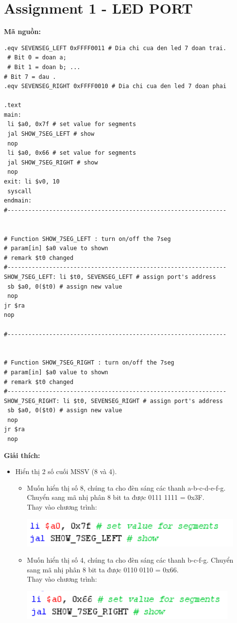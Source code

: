 \documentclass[12pt,a4paper,oneside]{article}
\begin{document}
\section*{Assignment 1 - LED PORT}
\textbf{Mã nguồn:}
\begin{lstlisting}
.eqv SEVENSEG_LEFT 0xFFFF0011 # Dia chi cua den led 7 doan trai.
 # Bit 0 = doan a; 
 # Bit 1 = doan b; ... 
# Bit 7 = dau .
.eqv SEVENSEG_RIGHT 0xFFFF0010 # Dia chi cua den led 7 doan phai

.text
main:
 li $a0, 0x7f # set value for segments
 jal SHOW_7SEG_LEFT # show
 nop
 li $a0, 0x66 # set value for segments
 jal SHOW_7SEG_RIGHT # show 
 nop
exit: li $v0, 10
 syscall
endmain:
#---------------------------------------------------------------


# Function SHOW_7SEG_LEFT : turn on/off the 7seg
# param[in] $a0 value to shown 
# remark $t0 changed
#---------------------------------------------------------------
SHOW_7SEG_LEFT: li $t0, SEVENSEG_LEFT # assign port's address
 sb $a0, 0($t0) # assign new value 
 nop
jr $ra
nop

#---------------------------------------------------------------


# Function SHOW_7SEG_RIGHT : turn on/off the 7seg
# param[in] $a0 value to shown 
# remark $t0 changed
#---------------------------------------------------------------
SHOW_7SEG_RIGHT: li $t0, SEVENSEG_RIGHT # assign port's address
 sb $a0, 0($t0) # assign new value
 nop
jr $ra 
 nop
\end{lstlisting}
\pagebreak
\textbf{Giải thích:}
\begin{itemize}
\item Hiển thị 2 số cuối MSSV (8 và 4). 
	\begin{itemize}
	\item Muốn hiển thị số 8, chúng ta cho đèn sáng các thanh a-b-c-d-e-f-g. Chuyển sang mã nhị phân 8 bit ta được 0111 1111 = 0x3F.\\Thay vào chương trình:
	\begin{center}
	\includegraphics[scale=1]{1}
	\end{center}
	\item Muốn hiển thị số 4, chúng ta cho đèn sáng các thanh b-c-f-g. Chuyển sang mã nhị phân 8 bit ta được 0110 0110 = 0x66.\\Thay vào chương trình:
	\begin{center}
	\includegraphics[scale=1]{2}
	\end{center}
	\end{itemize}
\end{itemize}
\end{document}
